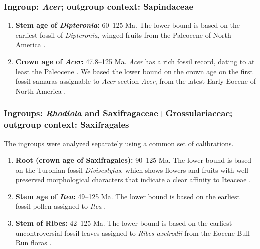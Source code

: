 \subsubsection*{Ingroup: \textit{Acer}; outgroup context: Sapindaceae}


\begin{enumerate}

\item \textbf{Stem age of \textit{Dipteronia}:} 60--125 Ma. The
  lower bound is based on the earliest fossil of
  \textit{Dipteronia}, winged fruits from the Paleocene of North
  America \citep{McClain2001}.

\item \textbf{Crown age of \textit{Acer}:} 47.8--125 Ma. \textit{Acer}
  has a rich fossil record, dating to at least the Paleocene
  \citep{Wolfe1987,Mai1995}. We based the lower bound on the crown age
  on the first fossil samaras assignable to \textit{Acer} section
  \textit{Acer}, from the latest Early Eocene of North America
  \citep{Wolfe1987}.

\end{enumerate}

\subsubsection*{Ingroups: \textit{Rhodiola} and
  Saxifragaceae+Grossulariaceae; outgroup context: Saxifragales}

The ingroups were analyzed separately using a common set of
calibrations.

\begin{enumerate}
\item \textbf{Root (crown age of Saxifragales):} 90--125 Ma. The lower
  bound is based on the Turonian fossil \textit{Divisestylus}, which
  shows flowers and fruits with well-preserved morphological
  characters that indicate a clear affinity to Iteaceae
  \citep{Hermsen2003}.

\item \textbf{Stem age of \textit{Itea}:} 49--125 Ma. The lower
  bound is based on the earliest fossil pollen assigned to \emph{Itea}
  \citep{Hermsen2013}.

\item \textbf{Stem of Ribes:} 42--125 Ma. The lower bound is based
  on the earliest uncontroversial fossil leaves assigned to
  \textit{Ribes axelrodii} from the Eocene Bull Run floras
  \citep{Hermsen2005}.
\end{enumerate}

